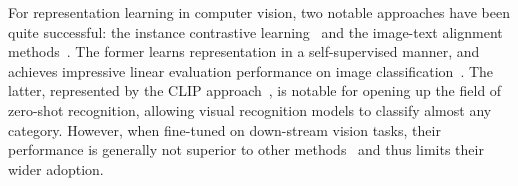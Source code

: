 \documentclass{article}
\begin{document}
For representation learning in computer vision, two notable approaches have been quite successful: the instance contrastive learning~\cite{dosovitskiy2014exemplarcnn,he2019moco,chen2020simclr,grill2020byol,chen2021mocov3,caron2021emerging} and the image-text alignment methods~\cite{radford2021clip,jia2021align}. The former learns representation in a self-supervised manner, and achieves impressive linear evaluation performance on image classification~\cite{he2019moco,caron2021emerging}. The latter, represented by the CLIP approach~\cite{radford2021clip}, is notable for opening up the field of zero-shot recognition, allowing visual recognition models to classify almost any category. However, when fine-tuned on down-stream vision tasks, their performance is generally not superior to other methods~\cite{xie2021self, caron2021emerging,li2021esvit,ftclip2021} and thus limits their wider adoption. 
\end{document}

